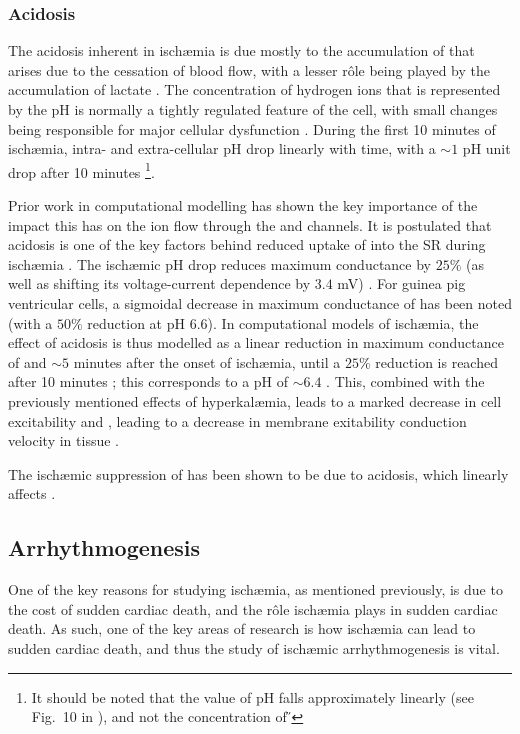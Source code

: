\documentclass[../thesis-main.tex]{subfiles}
\begin{document}
\subsubsection{Acidosis}
\label{subsubsec:acidosis}
The acidosis inherent in isch\ae{}mia is due mostly to the accumulation of  that arises due to the cessation of blood flow, with a lesser r\^ole being played by the accumulation of lactate \citep{Ichihara1984}. The concentration of hydrogen ions that is represented by the pH is normally a tightly regulated feature of the cell, with small changes being responsible for major cellular dysfunction \citep{Chen1998}. During the first 10 minutes of isch\ae{}mia, intra- and extra-cellular pH drop linearly with time, with a $\sim1$ pH unit drop after 10 minutes \citep{Shaw1997, Neely1975, Mohabir1991}\footnote{It should be noted that the value of pH falls approximately linearly (see Fig.~10 in \citet{Mohabir1991}), and not the concentration of \H{}}.

Prior work in computational modelling has shown the key importance of the impact this has on the ion flow through the \ina{} and \ica{} channels. It is postulated that acidosis is one of the key factors behind reduced uptake of \ca{} into the SR during isch\ae{}mia \citep{Krause1984}. The isch\ae{}mic pH drop reduces \ina{} maximum conductance by $25\%$ (as well as shifting its voltage-current dependence by $3.4$ mV) \citep{Kagiyama1982}. For guinea pig ventricular cells, a sigmoidal decrease in maximum conductance of \ica{} has been noted (with a $50\%$ reduction at pH $6.6$). In computational models of isch\ae{}mia, the effect of acidosis is thus modelled as a linear reduction in maximum conductance of \ina{} and \ica{} $\sim5$ minutes after the onset of isch\ae{}mia, until a $25\%$ reduction is reached after 10 minutes \citep{Trenor2007}; this corresponds to a pH of $\sim6.4$ \citep{Ferrero2003}. This, combined with the previously mentioned effects of hyperkal\ae{}mia, leads to a marked decrease in cell excitability and \dvdtmax{}, leading to a decrease in membrane exitability conduction velocity in tissue \citep{Shaw1997}.

The isch\ae{}mic suppression of \inak{} \citep{Dhalla1988} has been shown to be due to acidosis, which linearly affects \inak{} \citep{Severi2002}.

\subsection{Arrhythmogenesis}
\label{subsec:arrhythmogenesis}
One of the key reasons for studying isch\ae{}mia, as mentioned previously, is due to the cost of sudden cardiac death, and the r\^ole isch\ae{}mia plays in sudden cardiac death. As such, one of the key areas of research is how isch\ae{}mia can lead to sudden cardiac death, and thus the study of isch\ae{}mic arrhythmogenesis is vital.
\end{document}

